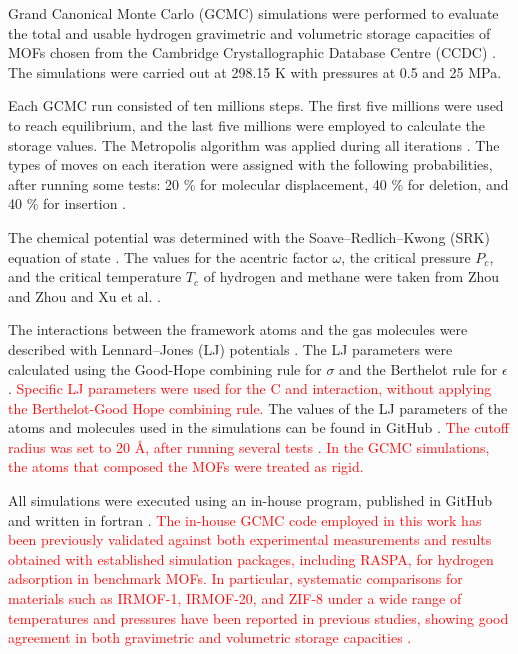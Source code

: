 \documentclass[review]{elsarticle}
\begin{document}
Grand Canonical Monte Carlo (GCMC) simulations were performed to evaluate the total and 
usable hydrogen gravimetric and volumetric storage capacities of MOFs chosen from the Cambridge Crystallographic Database Centre (CCDC) \cite{ccdc}. The simulations were carried out at 298.15 K with pressures at 0.5 and 25 MPa.

Each GCMC run consisted of ten millions steps. The first five millions were used to reach equilibrium, and the last five millions were employed to calculate the storage values. The Metropolis algorithm was applied during all iterations \cite{metropolis87}. The types of moves on each iteration were assigned with the following probabilities, after running some tests: 20 \% for molecular displacement, 40 \% for deletion, and 40 \% for insertion \cite{cc22,gc24,gc24a}.

The chemical potential was determined with the Soave–Redlich–Kwong (SRK) equation of state \cite{soave72}. The values for the acentric factor $\omega$, the critical pressure $P_c$, and the critical temperature $T_c$ of hydrogen and methane were taken from Zhou and Zhou \cite{zz01} and Xu et al. \cite{xdy12}.

The interactions between the framework atoms and the gas molecules were described with Lennard–Jones (LJ) potentials \cite{lennard24}. The LJ parameters were calculated using the Good-Hope combining rule for $\sigma$ \cite{gh70} and the Berthelot rule for $\epsilon$ \cite{berthelot1898}. \textcolor{red}{Specific LJ parameters were used for the C and  interaction, without applying the Berthelot-Good Hope combining rule.} The values of the LJ parameters of the atoms and molecules used in 
the simulations can be found in GitHub \cite{mcmgs}. \textcolor{red}{The cutoff radius was set to 20 \AA{}, after running several tests \cite{cc22,gc24,gc24a}. In the GCMC simulations, the atoms that composed the MOFs were treated as rigid.}

All simulations were executed using an in-house program, published in GitHub and written in fortran \cite{mcmgs}. \textcolor{red}{
The in-house GCMC code employed in this work has been previously validated against both
experimental measurements and results obtained with established simulation packages,
including RASPA, for hydrogen adsorption in benchmark MOFs.
In particular, systematic comparisons for materials such as IRMOF-1, IRMOF-20, and ZIF-8
under a wide range of temperatures and pressures have been reported in previous studies,
showing good agreement in both gravimetric and volumetric storage capacities
\cite{gc24a,gc24b,gc24c,gc25a}.}
\end{document}
